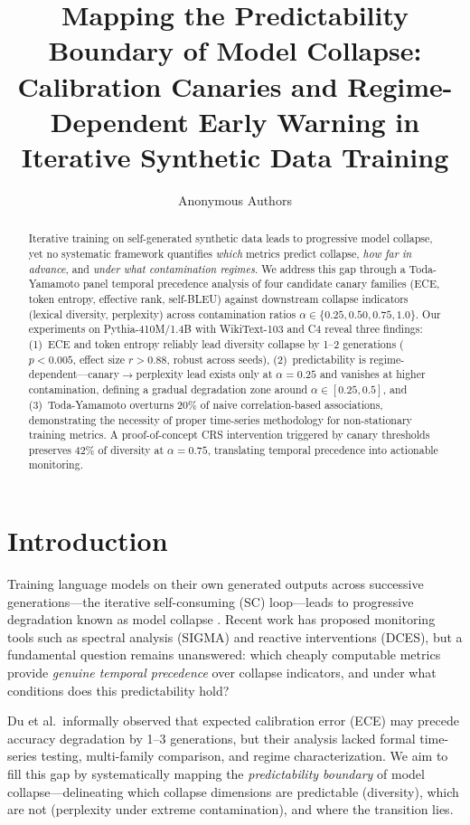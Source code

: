 \documentclass[letterpaper]{article}
\title{Mapping the Predictability Boundary of Model Collapse:\\Calibration Canaries and Regime-Dependent Early Warning in Iterative Synthetic Data Training}
\author{Anonymous Authors}
\date{}
\begin{document}
\maketitle

\begin{abstract}
Iterative training on self-generated synthetic data leads to progressive model collapse, yet no systematic framework quantifies \emph{which} metrics predict collapse, \emph{how far in advance}, and \emph{under what contamination regimes}. We address this gap through a Toda-Yamamoto panel temporal precedence analysis of four candidate canary families (ECE, token entropy, effective rank, self-BLEU) against downstream collapse indicators (lexical diversity, perplexity) across contamination ratios $\alpha \in \{0.25, 0.50, 0.75, 1.0\}$. Our experiments on Pythia-410M/1.4B with WikiText-103 and C4 reveal three findings: (1)~ECE and token entropy reliably lead diversity collapse by 1--2 generations ($p<0.005$, effect size $r>0.88$, robust across seeds), (2)~predictability is regime-dependent---canary$\to$perplexity lead exists only at $\alpha=0.25$ and vanishes at higher contamination, defining a gradual degradation zone around $\alpha \in [0.25, 0.5]$, and (3)~Toda-Yamamoto overturns 20\% of naive correlation-based associations, demonstrating the necessity of proper time-series methodology for non-stationary training metrics. A proof-of-concept CRS intervention triggered by canary thresholds preserves 42\% of diversity at $\alpha=0.75$, translating temporal precedence into actionable monitoring.
\end{abstract}

\section{Introduction}

Training language models on their own generated outputs across successive generations---the iterative self-consuming (SC) loop---leads to progressive degradation known as model collapse \citep{shumailov2024model}. Recent work has proposed monitoring tools such as spectral analysis (SIGMA) and reactive interventions (DCES), but a fundamental question remains unanswered: which cheaply computable metrics provide \emph{genuine temporal precedence} over collapse indicators, and under what conditions does this predictability hold?

Du et al.\ informally observed that expected calibration error (ECE) may precede accuracy degradation by 1--3 generations, but their analysis lacked formal time-series testing, multi-family comparison, and regime characterization. We aim to fill this gap by systematically mapping the \emph{predictability boundary} of model collapse---delineating which collapse dimensions are predictable (diversity), which are not (perplexity under extreme contamination), and where the transition lies.
\end{document}
